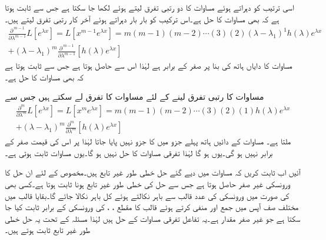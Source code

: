 اسی ترتیب کو دہراتے ہوئے مساوات  کا دو رتبی تفرق لیتے ہوئے  لکھا جا سکتا ہے جس سے ثابت ہوتا ہے کہ  بھی مساوات  کا حل ہے۔اس ترکیب کو بار بار دہراتے ہوئے آخر کار  رتبی تفرق لیتے ہیں۔
\begin{multline}\label{مساوات_سادہ_بلند_متعدد_گنا_جذر_ٹ}
\frac{\partial^{\, m-1} }{\partial \lambda^{m-1}} L[e^{\lambda x}]=L[x^{m-1}e^{\lambda x}]=m(m-1)(m-2)\cdots (3)(2)(\lambda-\lambda_1)^{1}h(\lambda)e^{\lambda x}\\
+(\lambda-\lambda_1)^m \frac{\partial^{\, m-1}}{\partial \lambda^{m-1}}[h(\lambda)e^{\lambda x}]
\end{multline}
مساوات کا دایاں ہاتھ  کی بنا  پر صفر کے برابر ہے لہٰذا اس سے  حاصل ہوتا ہے جس سے ثابت ہوتا ہے کہ  بھی مساوات  کا حل ہے۔

مساوات  کا  رتبی تفرق لینے کے لئے مساوات  کا تفرق لے سکتے ہیں جس سے
\begin{multline*}
\frac{\partial^m }{\partial \lambda^m} L[e^{\lambda x}]=L[x^me^{\lambda x}]=m(m-1)(m-2)\cdots (3)(2)(1)h(\lambda)e^{\lambda x}\\
+(\lambda-\lambda_1)^m \frac{\partial^m}{\partial \lambda^m}[h(\lambda)e^{\lambda x}]
\end{multline*}
ملتا ہے۔ مساوات کے دائیں ہاتھ پہلے جزو میں  کا جزو نہیں پایا جاتا لہٰذا  پر اس کی قیمت صفر کے برابر نہیں ہو گی۔یوں  ہو گا لہٰذا  تفرقی مساوات  کا حل نہیں ہو گا۔یوں مساوات  ثابت ہوتی ہے۔

آئیں اب ثابت کریں کہ مساوات  میں دیے گئے حل خطی طور غیر تابع ہیں۔مخصوص  کے لئے ان حل کا ورونسکی غیر صفر حاصل ہوتا ہے جس سے حل کی خطی طور غیر تابع ہونا ثابت ہوتا ہے۔کسی بھی  کی صورت میں ورونسکی کی  عدد  قالب سے  باہر نکالتے ہوئے  کل  باہر نکالا جائے گا۔بقایا قالب میں مختلف صف آپس میں جمع اور منفی کرتے ہوئے قالب کا مقطع  ، ،   کی ورونسکی کے برابر ثابت کیا  جا سکتا ہے جو غیر صفر مقدار ہے۔یہ تفاعل تفرقی مساوات  کے حل ہیں لہٰذا مسئلہ  کے تحت یہ حل خطی طور غیر تابع ثابت ہوتے ہیں۔

